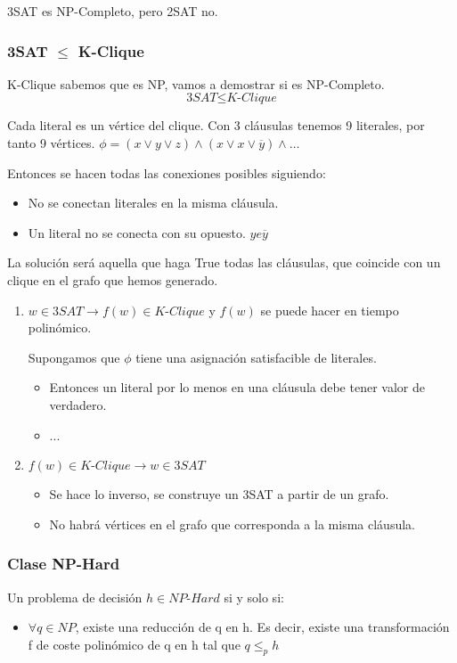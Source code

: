 3SAT es NP-Completo, pero 2SAT no.

\subsubsection{3SAT $\leq$ K-Clique}
K-Clique sabemos que es NP, vamos a demostrar si es NP-Completo.
$$\textit{3SAT} \leq \textit{K-Clique}$$

Cada literal es un vértice del clique. Con 3 cláusulas tenemos 9 literales, por tanto 9 vértices. $\phi=(x\vee y \vee z) \wedge (x\vee x \vee \overline{y}) \wedge \dots$

Entonces se hacen todas las conexiones posibles siguiendo:
\begin{itemize}
  \item No se conectan literales en la misma cláusula.
  \item Un literal no se conecta con su opuesto. $y e \overline{y}$
\end{itemize}

La solución será aquella que haga True todas las cláusulas, que coincide con un clique en el grafo que hemos generado.

\begin{enumerate}
  \item $w\in \textit{3SAT} \rightarrow f(w)\in \textit{K-Clique}$ y $f(w)$ se puede hacer en tiempo polinómico.
  
  Supongamos que $\phi$ tiene una asignación satisfacible de literales.
  \begin{itemize}
    \item Entonces un literal por lo menos en una cláusula debe tener valor de verdadero.
    \item ...
  \end{itemize}
  \item $f(w)\in \textit{K-Clique} \rightarrow w \in \textit{3SAT}$
  \begin{itemize}
    \item Se hace lo inverso, se construye un 3SAT a partir de un grafo.
    \item No habrá vértices en el grafo que corresponda a la misma cláusula.
  \end{itemize}
\end{enumerate}

\subsubsection{Clase NP-Hard}
Un problema de decisión $h \in \textit{NP-Hard}$ si y solo si:
\begin{itemize}
  \item $\forall q \in NP$, existe una reducción de q en h. Es decir, existe una transformación f de coste polinómico de q en h tal que $q \leq_p h$
\end{itemize}

